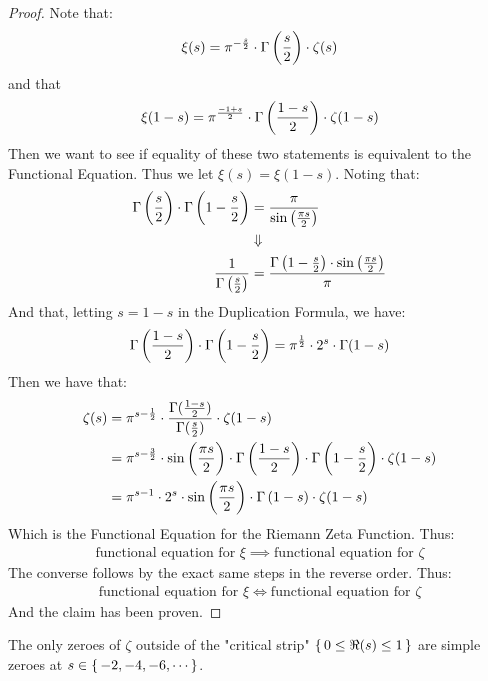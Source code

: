 \begin{proof}
Note that:
\begin{align*}
    \xi(s) = \pi^{-\frac{s}{2}} \cdot \Gamma\left( \frac{s}{2} \right) \cdot \zeta(s)
\end{align*}
and that
\begin{align*}
    \xi(1-s) = \pi^{\frac{-1+s}{2}} \cdot \Gamma\left( \frac{1-s}{2} \right) \cdot \zeta(1-s)
\end{align*}
Then we want to see if equality of these two statements is equivalent to the Functional Equation. Thus we let $\xi(s) = \xi(1-s)$. Noting that:
\begin{align*}
    \Gamma\left( \frac{s}{2} \right) \cdot \Gamma\left( 1- \frac{s}{2} \right) &= \frac{\pi}{ \sin\left( \frac{\pi s}{2} \right) }\\
    &\Downarrow\\
    \frac{1}{\Gamma\left( \frac{s}{2} \right)} &= \frac{\Gamma\left( 1- \frac{s}{2} \right) \cdot \sin\left( \frac{\pi s}{2} \right) }{\pi}
\end{align*}
And that, letting $s = 1-s$ in the Duplication Formula, we have:
\begin{align*}
     \Gamma\left( \frac{1-s}{2} \right) \cdot \Gamma\left( 1-\frac{s}{2} \right) = \pi ^{\frac{1}{2}} \cdot 2^{s} \cdot \Gamma(1-s)
\end{align*}
Then we have that:
\begin{align*}
    \zeta(s) &= \pi^{s - \frac{1}{2}} \cdot \frac{\Gamma(\frac{1-s}{2})}{\Gamma(\frac{s}{2})} \cdot \zeta(1-s)\\
    &= \pi^{s - \frac{3}{2}}\cdot \sin\left( \frac{\pi s}{2} \right) \cdot \Gamma\left( \frac{1-s}{2} \right) \cdot \Gamma\left( 1- \frac{s}{2} \right) \cdot    \zeta(1-s)\\
    &= \pi^{s - 1} \cdot 2^s \cdot \sin\left( \frac{\pi s}{2} \right) \cdot \Gamma\left( 1-s \right)  \cdot    \zeta(1-s)
\end{align*}
Which is the Functional Equation for the Riemann Zeta Function. Thus:
\begin{align*}
    \text{functional equation for $\xi$} \implies\text{functional equation for $\zeta$}
\end{align*}
The converse follows by the exact same steps in the reverse order. Thus:
\begin{align*}
    \text{functional equation for $\xi$} \iff \text{functional equation for $\zeta$}
\end{align*}
And the claim has been proven.
\end{proof}

\begin{corollary}
The only zeroes of $\zeta$ outside of the "critical strip" $\set{ 0 \leq \Re(s) \leq 1}$ are simple zeroes at $s \in \set{-2, -4, -6, \cdots}$.
\end{corollary}


